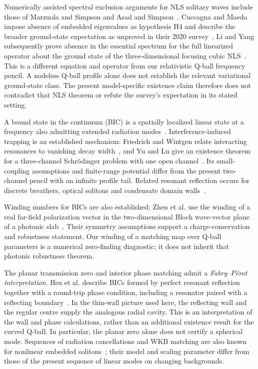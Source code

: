 Numerically assisted spectral exclusion arguments for NLS solitary waves
include those of Marzuola and Simpson and Asad and
Simpson~\cite{MarzuolaSimpson2011,AsadSimpson2011}.
Cuccagna and Maeda impose absence of embedded eigenvalues as hypothesis H4
and describe the broader ground-state expectation as unproved in their
2020 survey~\cite[Remark 3.2]{CuccagnaMaeda2020}.
Li and Yang subsequently prove absence in the essential spectrum for the
full linearized operator about the ground state of the three-dimensional
focusing cubic NLS~\cite[Theorem 1.1]{LiYang2026}. This is a different
equation and operator from our relativistic Q-ball frequency pencil.
A nodeless Q-ball profile alone does not establish the relevant
variational ground-state class. The present model-specific existence
claim therefore does not contradict that NLS theorem or refute the
survey's expectation in its stated setting.

A bound state in the continuum (BIC) is a spatially localized linear state
at a frequency also admitting extended radiation modes~\cite{Hsu2016}.
Interference-induced trapping is an established mechanism:
Friedrich and Wintgen relate interacting resonances to vanishing decay
width~\cite{FriedrichWintgen1985}, and Yu and Lu give an existence theorem
for a three-channel Schr\"odinger problem with one open
channel~\cite{YuLu2025}. Its small-coupling assumptions and finite-range
potential differ from the present two-channel pencil with an infinite
profile tail. Related resonant reflection occurs for discrete breathers,
optical solitons and condensate domain
walls~\cite{Flach2003,Flach2005,Watabe2012}.

Winding numbers for BICs are also established: Zhen et al. use the winding
of a real far-field polarization vector in the two-dimensional Bloch
wave-vector plane of a photonic slab~\cite{Zhen2014}. Their symmetry
assumptions support a charge-conservation and robustness statement.
Our winding of a matching map over Q-ball parameters is a numerical
zero-finding diagnostic; it does not inherit that photonic robustness
theorem.

The planar transmission zero and interior phase matching admit a
\emph{Fabry--P\'erot interpretation}. Hsu et al. describe BICs formed by
perfect resonant reflection together with a round-trip phase condition,
including a resonator paired with a reflecting boundary~\cite{Hsu2016}.
In the thin-wall picture used here, the reflecting wall and the regular
centre supply the analogous radial cavity. This is an interpretation of
the wall and phase calculations, rather than an additional existence
result for the curved Q-ball. In particular, the planar zero alone does
not certify a spherical mode. Sequences of radiation cancellations and
WKB matching are also known for nonlinear embedded
solitons~\cite{Malomed2005}; their model and scaling parameter differ from
those of the present sequence of linear modes on changing backgrounds.

